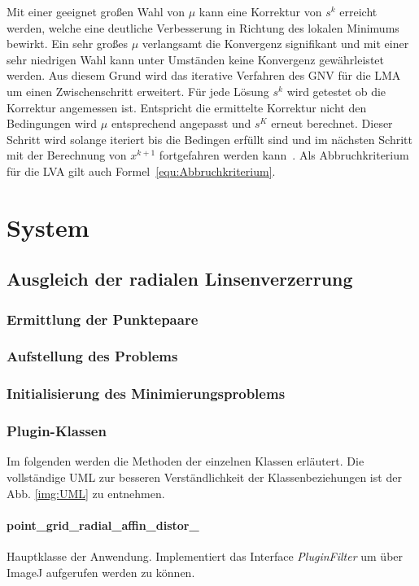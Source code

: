 Mit einer geeignet großen Wahl von $\mu$ kann eine Korrektur von $s^k$ erreicht werden, welche eine deutliche Verbesserung in Richtung des lokalen Minimums bewirkt. Ein sehr großes $\mu$ verlangsamt die Konvergenz signifikant und mit einer sehr niedrigen Wahl kann unter Umständen keine Konvergenz gewährleistet werden. Aus diesem Grund wird das iterative Verfahren des GNV für die LMA um einen Zwischenschritt erweitert. Für jede Lösung $s^k$ wird getestet ob die Korrektur angemessen ist. Entspricht die ermittelte Korrektur nicht den Bedingungen wird $\mu$ entsprechend angepasst und $s^K$ erneut berechnet. Dieser Schritt wird solange iteriert bis die Bedingen erfüllt sind und im nächsten Schritt mit der Berechnung von $x^{k+1}$ fortgefahren werden kann~\cite{dahmen2008numerik}. Als Abbruchkriterium für die LVA gilt auch Formel~\ref{equ:Abbruchkriterium}.

\section{System}

\subsection{Ausgleich der radialen Linsenverzerrung}
\subsubsection{Ermittlung der Punktepaare}
\subsubsection{Aufstellung des Problems}
\subsubsection{Initialisierung des Minimierungsproblems}
\subsubsection{Plugin-Klassen}

Im folgenden werden die Methoden der einzelnen Klassen erläutert. Die vollständige UML zur besseren Verständlichkeit der Klassenbeziehungen ist der Abb. \ref{img:UML} zu entnehmen.

\paragraph{point\_grid\_radial\_affin\_distor\_}
Hauptklasse der Anwendung. Implementiert das Interface \emph{PluginFilter} um über ImageJ aufgerufen werden zu können.

